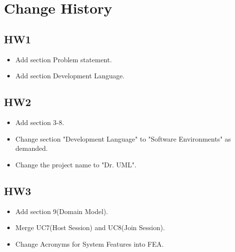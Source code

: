 \documentclass[12pt]{article}
\begin{document}
\begin{CJK*}{UTF8}{bsmi} %
\maketitlepage
\end{CJK*}




\section{Change History}
\subsection{HW1}
\begin{itemize}
    \item Add section Problem statement.
    \item Add section Development Language.
\end{itemize}
\subsection{HW2}

\begin{itemize}
    \item Add section 3-8.
    \item Change section "Development Language" to "Software Environments" as demanded.
    \item Change the project name to "Dr. UML".
\end{itemize}

\subsection{HW3}
\begin{itemize}
    \item Add section 9(Domain Model).
    \item Merge UC7(Host Session) and UC8(Join Session).
    \item Change Acronyms for System Features into FEA.
\end{itemize}
\end{document}
